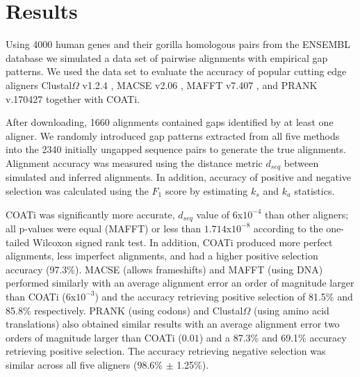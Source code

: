 \section{Results}

Using 4000 human genes and their gorilla homologous pairs from the ENSEMBL
database \parencite{ensembl_hubbard_2002} we simulated a data set of pairwise
alignments with empirical gap patterns.
We used the data set to evaluate the accuracy of popular cutting edge aligners
Clustal$\Omega$ v1.2.4 \parencite{clustal_omega_sievers_2011}, MACSE v2.06
\parencite{ranwez_macse_2011}, MAFFT v7.407 \parencite{mafft_katoh_2002}, and
PRANK v.170427 \parencite{prank_loytynoja_2014} together with COATi.

After downloading, 1660 alignments contained gaps identified by at least one
aligner.
We randomly introduced gap patterns extracted from all five methods into the
2340 initially ungapped sequence pairs to generate the true alignments.
Alignment accuracy was measured using the distance metric $d_{seq}$
\parencite{metrics_blackburne_whelan_2011} between simulated and inferred
alignments.
In addition, accuracy of positive and negative selection was calculated
using the $F_1$ score by estimating $k_s$ and $k_a$ statistics.


COATi was significantly more accurate, $d_{seq}$ value of $6$x$10^{-4}$  than
other aligners; all p-values were equal (MAFFT) or less than $1.714$x$10^{-8}$ according to the
one-tailed Wilcoxon signed rank test.
In addition, COATi produced more perfect alignments, less imperfect alignments,
and had a higher positive selection accuracy (97.3\%).
MACSE (allows frameshifts) and MAFFT (using DNA) performed similarly with an
average alignment error an order of magnitude larger than COATi ($6$x$10^{-3}$)
and the accuracy retrieving positive selection of 81.5\% and 85.8\% respectively.
PRANK (using codons) and Clustal$\Omega$ (using amino acid translations) also
obtained similar results with an average alignment error two orders of magnitude
larger than COATi ($0.01$) and a 87.3\% and 69.1\% accuracy retrieving positive
selection.
The accuracy retrieving negative selection was similar across all five
aligners (98.6\% $\pm$ 1.25\%).



